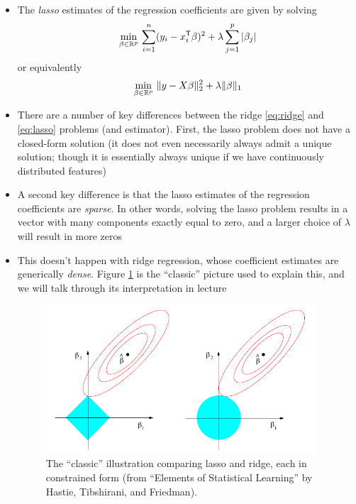 \documentclass{article}
\begin{document}
\begin{itemize}
\item The \emph{lasso} estimates of the regression coefficients are given by
  solving     
  \[
  \min_{\beta \in \mathbb{R}^p} \, \sum_{i=1}^n (y_i - x_i^{\mathsf{T}} \beta)^2 + \lambda
  \sum_{j=1}^p |\beta_j|
  \]
  or equivalently
  \begin{equation}
  \label{eq:lasso}
  \min_{\beta \in \mathbb{R}^p} \, \|y - X \beta\|_2^2 + \lambda \|\beta\|_1
  \end{equation}

\item There are a number of key differences between the ridge \eqref{eq:ridge}
  and \eqref{eq:lasso} problems (and estimator). First, the lasso problem does
  not have a closed-form solution (it does not even necessarily always admit a
  unique solution; though it is essentially always unique if we have
  continuously distributed features)

\item A second key difference is that the lasso estimates of the regression
  coefficients are \emph{sparse}. In other words, solving the lasso problem
  results in a vector \smash{$\hbeta$} with many components exactly equal to
  zero, and a larger choice of $\lambda$ will result in more zeros

\item This doesn't happen with ridge regression, whose coefficient estimates are
  generically \emph{dense}. Figure \ref{fig:lasso_ridge} is the ``classic''
  picture used to explain this, and we will talk through its interpretation in lecture 

\begin{figure}[htb]
\centering
\includegraphics[width=0.95\textwidth]{lasso_ridge.pdf}
\caption{The ``classic'' illustration comparing lasso and ridge, each in
  constrained form (from ``Elements of Statistical Learning'' by Hastie,
  Tibshirani, and Friedman).} 
\label{fig:lasso_ridge}
\end{figure}


\end{itemize}
\end{document}
